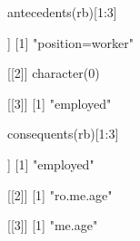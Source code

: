 \begin{Schunk}
% --begin: "searchrules4"
\begin{Sinput}
 antecedents(rb)[1:3]
\end{Sinput}
\begin{Soutput}
[[1]]
[1] "position=worker"

[[2]]
character(0)

[[3]]
[1] "employed"
\end{Soutput}
\begin{Sinput}
 consequents(rb)[1:3]
\end{Sinput}
\begin{Soutput}
[[1]]
[1] "employed"

[[2]]
[1] "ro.me.age"

[[3]]
[1] "me.age"
\end{Soutput}
%
% --end: "searchrules4"
\end{Schunk}
